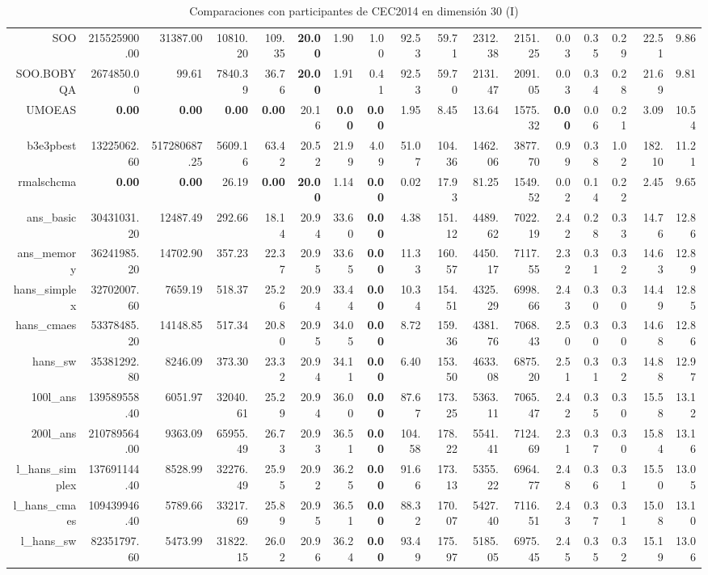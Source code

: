\begin{table}[h!]
\begin{tabular}{rrrrrrrrrrrrrrrrr}
  SOO & 215525900.00 & 31387.00 & 10810.20 & 109.35 & \textbf{20.00} & 1.90 & 1.00 & 92.53 & 59.71 & 2312.38 & 2151.25 & 0.03 & 0.35 & 0.29 & 22.51 & 9.86 \\ 
  SOO.BOBYQA & 2674850.00 & 99.61 & 7840.39 & 36.76 & \textbf{20.00} & 1.91 & 0.41 & 92.53 & 59.70 & 2131.47 & 2091.05 & 0.03 & 0.34 & 0.28 & 21.69 & 9.81 \\ 
  UMOEAS & \textbf{0.00} & \textbf{0.00} & \textbf{0.00} & \textbf{0.00} & 20.16 & \textbf{0.00} & \textbf{0.00} & 1.95 & 8.45 & 13.64 & 1575.32 & \textbf{0.00} & 0.06 & 0.21 & 3.09 & 10.54 \\ 
  b3e3pbest & 13225062.60 & 517280687.25 & 5609.16 & 63.42 & 20.52 & 21.99 & 4.09 & 51.07 & 104.36 & 1462.06 & 3877.70 & 0.99 & 0.38 & 1.02 & 182.10 & 11.21 \\ 
  rmalschcma & \textbf{0.00} & \textbf{0.00} & 26.19 & \textbf{0.00} & \textbf{20.00} & 1.14 & \textbf{0.00} & 0.02 & 17.93 & 81.25 & 1549.52 & 0.02 & 0.14 & 0.22 & 2.45 & 9.65 \\ 
  ans\_basic & 30431031.20 & 12487.49 & 292.66 & 18.14 & 20.94 & 33.60 & \textbf{0.00} & 4.38 & 151.12 & 4489.62 & 7022.19 & 2.42 & 0.28 & 0.33 & 14.76 & 12.86 \\ 
  ans\_memory & 36241985.20 & 14702.90 & 357.23 & 22.37 & 20.95 & 33.65 & \textbf{0.00} & 11.33 & 160.57 & 4450.17 & 7117.55 & 2.32 & 0.31 & 0.32 & 14.63 & 12.89 \\ 
  hans\_simplex & 32702007.60 & 7659.19 & 518.37 & 25.26 & 20.94 & 33.44 & \textbf{0.00} & 10.34 & 154.51 & 4325.29 & 6998.66 & 2.43 & 0.30 & 0.30 & 14.49 & 12.85 \\ 
  hans\_cmaes & 53378485.20 & 14148.85 & 517.34 & 20.80 & 20.95 & 34.05 & \textbf{0.00} & 8.72 & 159.36 & 4381.76 & 7068.43 & 2.50 & 0.30 & 0.30 & 14.68 & 12.86 \\ 
  hans\_sw & 35381292.80 & 8246.09 & 373.30 & 23.32 & 20.94 & 34.11 & \textbf{0.00} & 6.40 & 153.50 & 4633.08 & 6875.20 & 2.51 & 0.31 & 0.32 & 14.88 & 12.97 \\ 
  100l\_ans & 139589558.40 & 6051.97 & 32040.61 & 25.29 & 20.94 & 36.00 & \textbf{0.00} & 87.67 & 173.25 & 5363.11 & 7065.47 & 2.42 & 0.35 & 0.30 & 15.58 & 13.12 \\ 
  200l\_ans & 210789564.00 & 9363.09 & 65955.49 & 26.73 & 20.93 & 36.51 & \textbf{0.00} & 104.58 & 178.22 & 5541.41 & 7124.69 & 2.31 & 0.37 & 0.30 & 15.84 & 13.16 \\ 
  l\_hans\_simplex & 137691144.40 & 8528.99 & 32276.49 & 25.95 & 20.92 & 36.25 & \textbf{0.00} & 91.66 & 173.13 & 5355.22 & 6964.77 & 2.48 & 0.36 & 0.31 & 15.50 & 13.05 \\ 
  l\_hans\_cmaes & 109439946.40 & 5789.66 & 33217.69 & 25.89 & 20.95 & 36.51 & \textbf{0.00} & 88.32 & 170.07 & 5427.40 & 7116.51 & 2.43 & 0.37 & 0.31 & 15.08 & 13.10 \\ 
  l\_hans\_sw & 82351797.60 & 5473.99 & 31822.15 & 26.02 & 20.96 & 36.24 & \textbf{0.00} & 93.49 & 175.97 & 5185.05 & 6975.45 & 2.45 & 0.35 & 0.32 & 15.19 & 13.06 \\ 
   \hline
\end{tabular}
\endgroup
\caption{Comparaciones con participantes de CEC2014 en dimensión 30 (I)} 
\label{cec30a}
\end{table}
